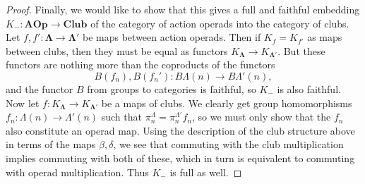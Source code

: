 \documentclass{amsbook} %
\newcommand{\mb}{\mathbf}
\numberwithin{section}{chapter}
\begin{document}
\begin{proof}

Finally, we would like to show that this gives a full and faithful embedding $K_{-}:\mb{AOp} \rightarrow \mb{Club}$ of the category of action operads into the category of clubs.  Let $f, f':\mb{\Lambda} \rightarrow \mb{\Lambda'}$ be maps between action operads.  Then if $K_{f} = K_{f'}$ as maps between clubs, then they must be equal as functors $K_{\mb{\Lambda}} \rightarrow K_{\mb{\Lambda'}}$.  But these functors are nothing more than the coproducts of the functors
\[
B(f_{n}), B(f_{n}'):B\Lambda(n) \rightarrow B\Lambda'(n),
\]
and the functor $B$ from groups to categories is faithful, so $K_{-}$ is also faithful.  Now let $f:K_{\mb{\Lambda}} \rightarrow K_{\mb{\Lambda'}}$ be a maps of clubs.  We clearly get group homomorphisms $f_{n}:\Lambda(n) \rightarrow \Lambda'(n)$ such that $\pi^{\Lambda}_{n} = \pi^{\Lambda'}_{n} f_{n}$, so we must only show that the $f_{n}$ also constitute an operad map.  Using the description of the club structure above in terms of the maps $\beta, \delta$, we see that commuting with the club multiplication implies commuting with both of these, which in turn is equivalent to commuting with operad multiplication.  Thus $K_{-}$ is full as well.
\end{proof}
\end{document}

